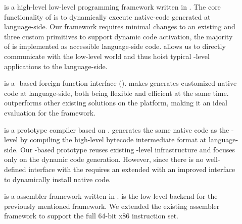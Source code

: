 \begin{description}
	\item[\B] is a high-level low-level programming framework written in .
	The core functionality of \B is to dynamically execute native-code generated at language-side.
	Our framework requires minimal changes to an existing \VM and three custom primitives to support dynamic code activation, the majority of \B is implemented as accessible language-side code.
	\B allows us to directly communicate with the low-level world and thus hoist typical \VM-level applications to the language-side.
		
	\item[\NB] is a \B-based foreign function interface (\FFI).
	\NB makes generates customized native code at language-side, both being flexible and efficient at the same time.
	\NB outperforms other existing \FFI solutions on the \PH platform, making it an ideal evaluation for the \B framework.
	
	\item[\NBJ] is a prototype \JIT compiler based on \B.
	\NBJ generates the same native code as the \VM-level \JIT by compiling the high-level bytecode intermediate format at language-side.
	Our \B-based \JIT prototype reuses existing \VM-level infrastructure and focuses only on the dynamic code generation.
	However, since there is no well-defined interface with the \VM \NBJ requires an extended \VM with an improved \JIT interface to dynamically install native code.
	
	\item[\AsmJIT] is a assembler framework written in \PH.
	\AsmJIT is the low-level backend for the previously mentioned \B framework.
	We extended the existing assembler framework to support the full 64-bit x86 instruction set.

	
\end{description}


